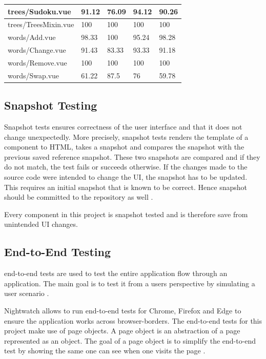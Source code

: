\begin{table}
\begin{tabular}{|l|l|l|l|l|}
        trees/Sudoku.vue & 91.12 & 76.09 & 94.12 & 90.26 \\ \hline
        trees/TreesMixin.vue & 100 & 100 & 100 & 100 \\ \hline
        words/Add.vue & 98.33 & 100 & 95.24 & 98.28 \\ \hline
        words/Change.vue & 91.43 & 83.33 & 93.33 & 91.18 \\ \hline
        words/Remove.vue & 100 & 100 & 100 & 100 \\ \hline
        words/Swap.vue & 61.22 & 87.5 & 76 & 59.78 \\ \hline
    \end{tabular}
\end{table}

\subsection{Snapshot Testing}
\label{subsection:snapshotTesting}
Snapshot tests ensures correctness of the user interface and that it does not change unexpectedly. More precisely, snapshot tests renders the template of a component to HTML, takes a snapshot and compares the snapshot with the previous saved reference snapshot. These two snapshots are compared and if they do not match, the test fails or succeeds otherwise. If the changes made to the source code were intended to change the UI, the snapshot has to be updated. This requires an initial snapshot that is known to be correct. Hence snapshot should be committed to the repository as well \cite{Jest}.

Every component in this project is snapshot tested and is therefore save from unintended UI changes.

\subsection{End-to-End Testing}
\label{subsection:e2e}
end-to-end tests are used to test the entire application flow through an application. The main goal is to test it from a users perspective by simulating a user scenario \cite{EndToEndTests}. 

Nightwatch allows to run end-to-end tests for Chrome, Firefox and Edge to ensure the application works across browser-borders. The end-to-end tests for this project make use of page objects. A page object is an abstraction of a page represented as an object. The goal of a page object is to simplify the end-to-end test by showing the same one can see when one visits the page \cite{Nightwatch}.

